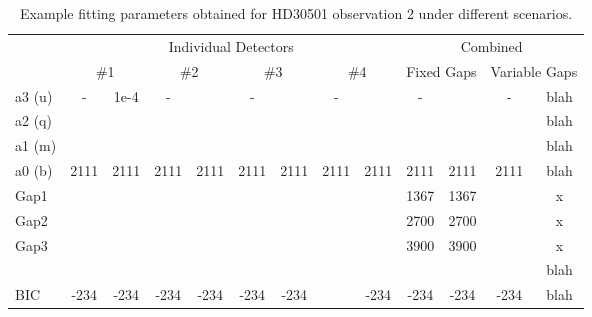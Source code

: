 \begin{table}
    \small
    \caption{Example fitting parameters obtained for HD30501 observation 2 under different scenarios.}
    \begin{tabular}{|l|c|c|c|c|c|c|c|c|c|c|c|c|}
    	\toprule
    	~    &    \multicolumn{8}{c|}{Individual Detectors}    &    \multicolumn{4}{c|}{Combined}    \\
    	~    & \multicolumn{2}{c|}{\#1} & \multicolumn{2}{c|}{\#2} & \multicolumn{2}{c|}{\#3} & \multicolumn{2}{c|}{\#4} & \multicolumn{2}{c|}{Fixed Gaps} & \multicolumn{2}{c|}{Variable Gaps} \\ \midrule
    	a3 (u)    &  -   &    1e-4    &  -   &    &  -   &    &  -   &    &  -   &    &  -   &    blah    \\
    	a2 (q)    &      &    &    &    &    &    &    &    &    &    &    &    blah    \\
    	a1 (m)   &      &    &    &    &    &    &    &    &    &    &    &    blah    \\
    	a0 (b)    & 2111 &    2111    & 2111 &    2111    & 2111 &    2111    & 2111 &    2111    & 2111 &    2111    & 2111 & blah \\
        Gap1 &      &    &    &    &    &    &    &    &   1367  & 1367   &   & x\\
        Gap2 &      &    &    &    &    &    &    &    &  2700   &  2700  &   & x\\
        Gap3 &      &    &    &    &    &    &    &    &   3900 &   3900 &    & x\\
    	\textchisquared{} &    &    &    &    &    &    &    &    &    &    &    &    blah    \\
    	BIC        & -234      &    -234    & -234 &    -234    & -234 &    -234    &    &    -234    & -234 &    -234    & -234 &    blah  \\ 
        \bottomrule
    \end{tabular}\label{tab:example_calibration_parametres}
\end{table}


